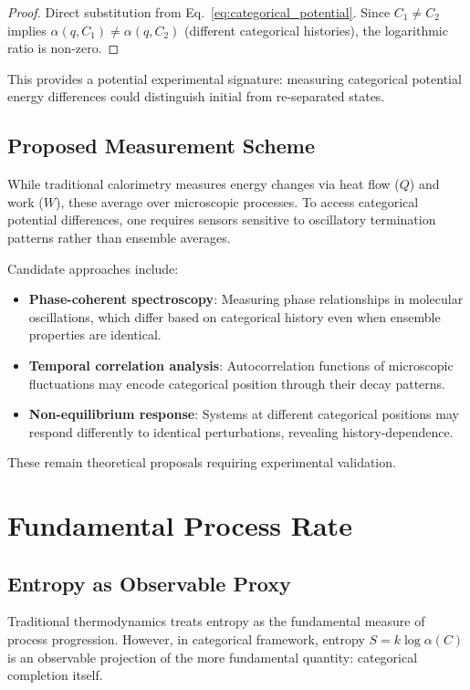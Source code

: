 \documentclass[12pt,a4paper]{article}
\theoremstyle{remark}
\begin{document}
\begin{proof}
Direct substitution from Eq.~\eqref{eq:categorical_potential}. Since $C_1 \neq C_2$ implies $\alpha(q, C_1) \neq \alpha(q, C_2)$ (different categorical histories), the logarithmic ratio is non-zero.
\end{proof}

This provides a potential experimental signature: measuring categorical potential energy differences could distinguish initial from re-separated states.

\subsection{Proposed Measurement Scheme}

While traditional calorimetry measures energy changes via heat flow ($Q$) and work ($W$), these average over microscopic processes. To access categorical potential differences, one requires sensors sensitive to oscillatory termination patterns rather than ensemble averages.

Candidate approaches include:
\begin{itemize}
\item \textbf{Phase-coherent spectroscopy}: Measuring phase relationships in molecular oscillations, which differ based on categorical history even when ensemble properties are identical.
\item \textbf{Temporal correlation analysis}: Autocorrelation functions of microscopic fluctuations may encode categorical position through their decay patterns.
\item \textbf{Non-equilibrium response}: Systems at different categorical positions may respond differently to identical perturbations, revealing history-dependence.
\end{itemize}

These remain theoretical proposals requiring experimental validation.

\section{Fundamental Process Rate}

\subsection{Entropy as Observable Proxy}

Traditional thermodynamics treats entropy as the fundamental measure of process progression. However, in categorical framework, entropy $S = k \log \alpha(C)$ is an observable projection of the more fundamental quantity: categorical completion itself.
\end{document}
